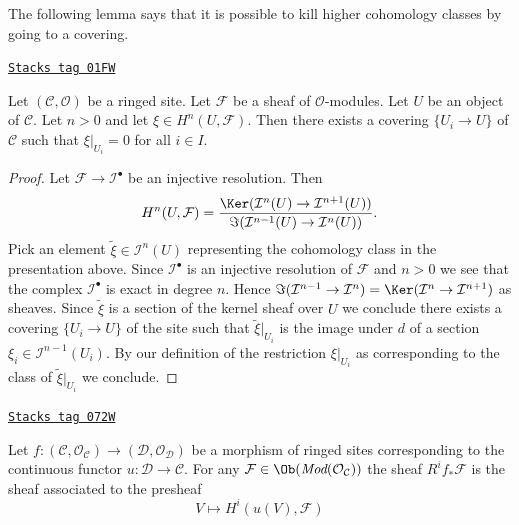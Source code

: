 \medskip\noindent
The following lemma says that it is possible to kill higher cohomology
classes by going to a covering.

\begin{lemma}
\label{sites-cohomology-lemma-kill-cohomology-class-on-covering}
\href{https://stacks.math.columbia.edu/tag/01FW}{\texttt{Stacks tag 01FW}}

Let $(\mathcal{C}, \mathcal{O})$ be a ringed site.
Let $\mathcal{F}$ be a sheaf of $\mathcal{O}$-modules.
Let $U$ be an object of $\mathcal{C}$.
Let $n > 0$ and let $\xi \in H^n(U, \mathcal{F})$.
Then there exists a covering $\{U_i \to U\}$ of $\mathcal{C}$
such that $\xi|_{U_i} = 0$ for all $i \in I$.
\end{lemma}

\begin{proof}
Let $\mathcal{F} \to \mathcal{I}^\bullet$ be an injective resolution.
Then
$$
H^n(U, \mathcal{F}) =
\frac{\Ker(\mathcal{I}^n(U) \to \mathcal{I}^{n + 1}(U))}
{\Im(\mathcal{I}^{n - 1}(U) \to \mathcal{I}^n(U))}.
$$
Pick an element $\tilde \xi \in \mathcal{I}^n(U)$ representing the
cohomology class in the presentation above. Since $\mathcal{I}^\bullet$
is an injective resolution of $\mathcal{F}$ and $n > 0$ we see that
the complex $\mathcal{I}^\bullet$ is exact in degree $n$. Hence
$\Im(\mathcal{I}^{n - 1} \to \mathcal{I}^n) =
\Ker(\mathcal{I}^n \to \mathcal{I}^{n + 1})$ as sheaves.
Since $\tilde \xi$ is a section of the kernel sheaf over $U$
we conclude there exists a covering $\{U_i \to U\}$ of the site
such that $\tilde \xi|_{U_i}$ is the image under $d$ of a section
$\xi_i \in \mathcal{I}^{n - 1}(U_i)$. By our definition of the
restriction $\xi|_{U_i}$ as corresponding to the class of
$\tilde \xi|_{U_i}$ we conclude.
\end{proof}

\begin{lemma}
\label{sites-cohomology-lemma-higher-direct-images}
\href{https://stacks.math.columbia.edu/tag/072W}{\texttt{Stacks tag 072W}}

Let $f : (\mathcal{C}, \mathcal{O}_\mathcal{C}) \to
(\mathcal{D}, \mathcal{O}_\mathcal{D})$ be a morphism of ringed sites
corresponding to the continuous functor $u : \mathcal{D} \to \mathcal{C}$.
For any $\mathcal{F} \in \Ob(\textit{Mod}(\mathcal{O}_\mathcal{C}))$
the sheaf $R^if_*\mathcal{F}$ is the sheaf associated to the
presheaf
$$
V \longmapsto H^i(u(V), \mathcal{F})
$$
\end{lemma}

